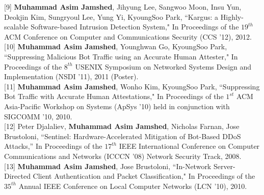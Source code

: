 \documentclass[10pt]{article}
\renewcommand{\section}[2]%
        {\pagebreak[2]\vspace{1.3\baselineskip}%
         \phantomsection\addcontentsline{toc}{section}{#1}%
         \hspace{0in}%
         \marginpar{
         \raggedright \scshape #1}#2}
\begin{document}
[9] {\bf Muhammad Asim Jamshed}, Jihyung Lee, Sangwoo Moon, Insu Yun,
Deokjin Kim, Sungryoul Lee, Yung Yi, KyoungSoo Park,
{ ``Kargus: a Highly-scalable Software-based Intrusion Detection System," }
    In Proceedings of the $19^{th}$ ACM Conference on Computer and
    Communications Security (CCS '12), 2012. \\

[10] {\bf Muhammad Asim Jamshed}, Younghwan Go, KyoungSoo Park,
{ ``Suppressing Malicious Bot Traffic using an Accurate Human Attester," }
     In Proceedings of the $8^{th}$ USENIX Symposium on Networked Systems
     Design and Implementation (NSDI '11), 2011 (Poster).\\
     
[11] {\bf Muhammad Asim Jamshed}, Wonho Kim, KyoungSoo Park, 
     { ``Suppressing Bot Traffic with Accurate Human Attestations," }
     In Proceedings of the $1^{st}$ ACM Asia-Pacific Workshop on Systems
     (ApSys '10) held in conjunction with SIGCOMM '10, 2010.\\

[12] Peter Djalaliev, {\bf Muhammad Asim Jamshed}, Nicholas Farnan, Jose
Brustoloni, 
	{``Sentinel: Hardware-Accelerated Mitigation of Bot-Based DDoS Attacks,''}
	In Proceedings of the $17^{th}$ IEEE International Conference on
	Computer Communications and Networks (ICCCN '08) Network Security Track, 2008. \\

[13] {\bf Muhammad Asim Jamshed}, Jose Brustoloni,
	{``In-Network Server-Directed Client Authentication and Packet Classification,"}
	In Proceedings of the $35^{th}$ Annual IEEE Conference on Local 
	Computer Networks (LCN '10), 2010.\\


\end{document}
